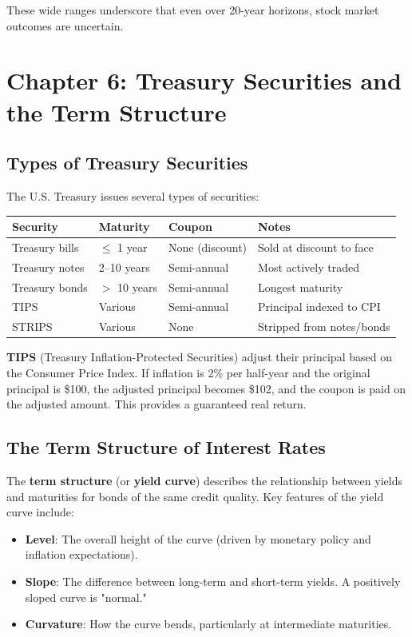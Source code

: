 \documentclass[11pt,letterpaper]{report}
\begin{document}
These wide ranges underscore that even over 20-year horizons, stock market outcomes are uncertain.


\chapter{Chapter 6: Treasury Securities and the Term Structure}


\section{Types of Treasury Securities}


The U.S. Treasury issues several types of securities:

\begin{center}
\begin{tabular}{llll}
\toprule
\textbf{Security} & \textbf{Maturity} & \textbf{Coupon} & \textbf{Notes} \\
\midrule
Treasury bills & $\leq$ 1 year & None (discount) & Sold at discount to face \\
Treasury notes & 2--10 years & Semi-annual & Most actively traded \\
Treasury bonds & $>$ 10 years & Semi-annual & Longest maturity \\
TIPS & Various & Semi-annual & Principal indexed to CPI \\
STRIPS & Various & None & Stripped from notes/bonds \\
\bottomrule
\end{tabular}
\end{center}


\textbf{TIPS} (Treasury Inflation-Protected Securities) adjust their principal based on the Consumer Price Index.  If inflation is 2\% per half-year and the original principal is \$100, the adjusted principal becomes \$102, and the coupon is paid on the adjusted amount.  This provides a guaranteed real return.

\section{The Term Structure of Interest Rates}


The \textbf{term structure} (or \textbf{yield curve}) describes the relationship between yields and maturities for bonds of the same credit quality.  Key features of the yield curve include:

\begin{itemize}
  \item \textbf{Level}: The overall height of the curve (driven by monetary policy and inflation expectations).
  \item \textbf{Slope}: The difference between long-term and short-term yields.  A positively sloped curve is "normal."
  \item \textbf{Curvature}: How the curve bends, particularly at intermediate maturities.
\end{itemize}
\end{document}

